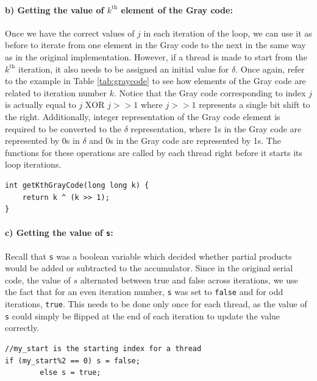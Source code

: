 \documentclass[ %
                    author={Manan Vaswani},
                supervisor={Dr. Raphael Clifford},
                    degree={MEng},
                     title={A multi-core CPU implementation of the classical Boson Sampling algorithm},
                  subtitle={},
                      type={},
                      year={2019} ]{dissertation}
\theoremstyle{plain}
\theoremstyle{definition}
\begin{document}
\paragraph{b) Getting the value of $k^{\text{th}}$ element of the Gray code:} Once we have the correct values of $j$ in each iteration of the loop, we can use it as before to iterate from one element in the Gray code to the next in the same way as in the original implementation. However, if a thread is made to start from the $k^{\text{th}}$ iteration, it also needs to be assigned an initial value for $\delta$. Once again, refer to the example in Table \ref{tab:graycode} to see how elements of the Gray code are related to iteration number $k$. Notice that the Gray code corresponding to index $j$ is actually equal to $j \text{ XOR } j >> 1$ where $j >> 1$ represents a single bit shift to the right. Additionally, integer representation of the Gray code element is required to be converted to the $\delta$ representation, where 1s in the Gray code are represented by 0s in $\delta$ and 0s in the Gray code are represented by 1s. The functions for these operations are called by each thread right before it starts its loop iterations.
\begin{verbatim}
int getKthGrayCode(long long k) {
    return k ^ (k >> 1);
}
\end{verbatim}

\paragraph{c) Getting the value of \texttt{s}:} Recall that \texttt{s} was a boolean variable which decided whether partial products would be added or subtracted to the accumulator. Since in the original serial code, the value of $s$ alternated between true and false across iterations, we use the fact that for an even iteration number, \texttt{s} was set to \texttt{false} and for odd iterations, \texttt{true}. This needs to be done only once for each thread, as the value of \texttt{s} could simply be flipped at the end of each iteration to update the value correctly.
\begin{verbatim}
//my_start is the starting index for a thread
if (my_start%2 == 0) s = false;
		else s = true;
\end{verbatim}
\end{document}
